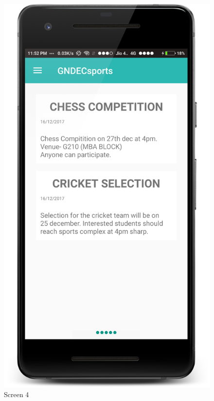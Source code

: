 \begin{figure}[ht]
\centering
\includegraphics[scale=0.13]{images/S4.png}
\caption{Screen 4}
\end{figure}

\newpage

